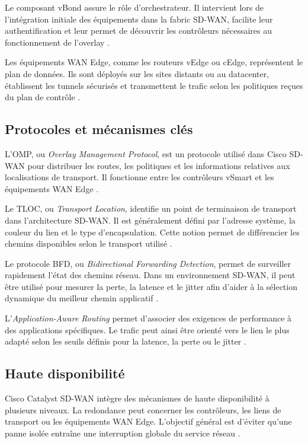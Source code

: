 \documentclass[12pt,a4paper,oneside]{report}
\begin{document}
	Le composant vBond assure le rôle d'orchestrateur. Il intervient lors de l'intégration initiale des équipements dans la fabric SD-WAN, facilite leur authentification et leur permet de découvrir les contrôleurs nécessaires au fonctionnement de l'overlay \cite{cisco_sdw_design}.
	
	Les équipements WAN Edge, comme les routeurs vEdge ou cEdge, représentent le plan de données. Ils sont déployés sur les sites distants ou au datacenter, établissent les tunnels sécurisés et transmettent le trafic selon les politiques reçues du plan de contrôle \cite{cisco_sdw_design}.
	
	\subsection{Protocoles et mécanismes clés}
	
	L'OMP, ou \textit{Overlay Management Protocol}, est un protocole utilisé dans Cisco SD-WAN pour distribuer les routes, les politiques et les informations relatives aux localisations de transport. Il fonctionne entre les contrôleurs vSmart et les équipements WAN Edge \cite{cisco_sdw_design,cisco_sdw_commands}.
	
	Le TLOC, ou \textit{Transport Location}, identifie un point de terminaison de transport dans l'architecture SD-WAN. Il est généralement défini par l'adresse système, la couleur du lien et le type d'encapsulation. Cette notion permet de différencier les chemins disponibles selon le transport utilisé \cite{cisco_sdw_design}.
	
	Le protocole BFD, ou \textit{Bidirectional Forwarding Detection}, permet de surveiller rapidement l'état des chemins réseau. Dans un environnement SD-WAN, il peut être utilisé pour mesurer la perte, la latence et le jitter afin d'aider à la sélection dynamique du meilleur chemin applicatif \cite{cisco_sdw_design}.
	
	L'\textit{Application-Aware Routing} permet d'associer des exigences de performance à des applications spécifiques. Le trafic peut ainsi être orienté vers le lien le plus adapté selon les seuils définis pour la latence, la perte ou le jitter \cite{cisco_sdw_design}.
	
	\subsection{Haute disponibilité}
	
	Cisco Catalyst SD-WAN intègre des mécanismes de haute disponibilité à plusieurs niveaux. La redondance peut concerner les contrôleurs, les liens de transport ou les équipements WAN Edge. L'objectif général est d'éviter qu'une panne isolée entraîne une interruption globale du service réseau \cite{cisco_sdw_design}.
	
\end{document}
